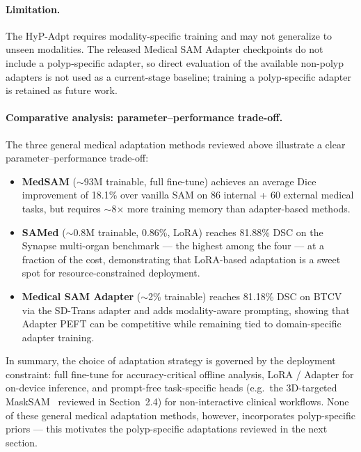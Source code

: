 \paragraph{Limitation.} The HyP-Adpt requires modality-specific training and may not generalize to unseen modalities. The released Medical SAM Adapter checkpoints do not include a polyp-specific adapter, so direct evaluation of the available non-polyp adapters is not used as a current-stage baseline; training a polyp-specific adapter is retained as future work.

\paragraph{Comparative analysis: parameter--performance trade-off.}
The three general medical adaptation methods reviewed above illustrate a clear parameter--performance trade-off:

\begin{itemize}
  \item \textbf{MedSAM} ($\sim$93M trainable, full fine-tune) achieves an average Dice improvement of 18.1\% over vanilla SAM on 86 internal + 60 external medical tasks, but requires $\sim$8$\times$ more training memory than adapter-based methods.
  \item \textbf{SAMed} ($\sim$0.8M trainable, 0.86\%, LoRA) reaches 81.88\% DSC on the Synapse multi-organ benchmark --- the highest among the four --- at a fraction of the cost, demonstrating that LoRA-based adaptation is a sweet spot for resource-constrained deployment.
  \item \textbf{Medical SAM Adapter} ($\sim$2\% trainable) reaches 81.18\% DSC on BTCV via the SD-Trans adapter and adds modality-aware prompting, showing that Adapter PEFT can be competitive while remaining tied to domain-specific adapter training.
\end{itemize}

In summary, the choice of adaptation strategy is governed by the deployment constraint: full fine-tune for accuracy-critical offline analysis, LoRA / Adapter for on-device inference, and prompt-free task-specific heads (e.g.\ the 3D-targeted MaskSAM~\cite{cheng2024masksam} reviewed in Section~2.4) for non-interactive clinical workflows. None of these general medical adaptation methods, however, incorporates polyp-specific priors --- this motivates the polyp-specific adaptations reviewed in the next section.


